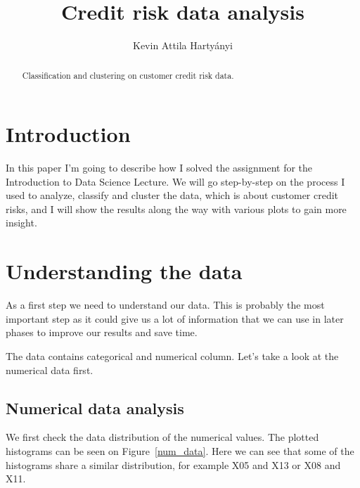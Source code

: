 \documentclass[runningheads]{llncs}
\begin{document}
%
\title{Credit risk data analysis}
%
%
\author{Kevin Attila Hartyányi}
%
%
%
\maketitle              %
%
\begin{abstract}
Classification and clustering on customer credit risk data.

\end{abstract}
%
%
%
\section{Introduction}
In this paper I'm going to describe how I solved the assignment for the Introduction to Data Science Lecture. We will go step-by-step on the process I used to analyze, classify and cluster the data, which is about customer credit risks, and I will show the results along the way with various plots to gain more insight.

\section{Understanding the data}
As a first step we need to understand our data. This is probably the most important step as it could give us a lot of information that we can use in later phases to improve our results and save time.

The data contains categorical and numerical column. Let's take a look at the numerical data first.

\subsection{Numerical data analysis}

We first check the data distribution of the numerical values. The plotted histograms can be seen on Figure~\ref{num_data}. Here we can see that some of the histograms share a similar distribution, for example X05 and X13 or X08 and X11.
\end{document}
